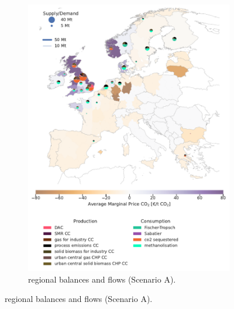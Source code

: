 \documentclass[preprint,12pt]{elsarticle}
\begin{document}
\begin{figure}[!htbp]
\begin{subfigure}[t]{0.47\textwidth}
      \includegraphics[width=\textwidth]{balance_map_co2_scenario_a}
      \vspace{-0.7cm}
      \caption{ regional balances and flows (Scenario A).}
      \label{fig:balance_map_co2_scenario_a}
  \end{subfigure}

  \vspace{0.2cm} %


\end{figure}
\end{document}
